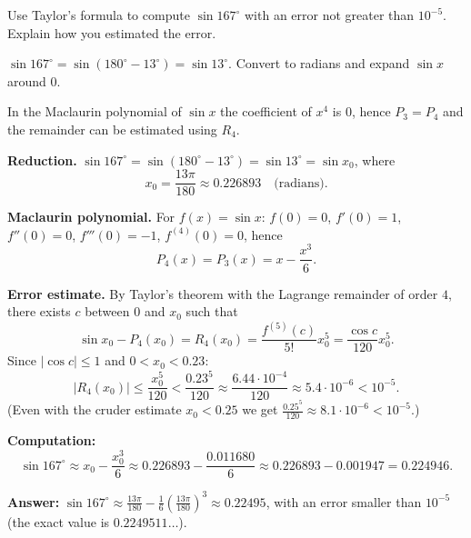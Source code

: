
\begin{question}
Use Taylor's formula to compute $\sin 167^\circ$ with an error not greater than $10^{-5}$. Explain how you estimated the error.
\end{question}

\begin{hint}
$\sin167^\circ=\sin(180^\circ-13^\circ)=\sin13^\circ$. Convert to radians and expand $\sin x$ around $0$.
\end{hint}

\begin{hint}
In the Maclaurin polynomial of $\sin x$ the coefficient of $x^4$ is $0$, hence $P_3=P_4$ and the remainder can be estimated using $R_4$.
\end{hint}

\begin{solution}
\textbf{Reduction.} $\sin167^\circ=\sin(180^\circ-13^\circ)=\sin13^\circ=\sin x_0$, where
\[
x_0=\frac{13\pi}{180}\approx0.226893 \quad\text{(radians)}.
\]

\textbf{Maclaurin polynomial.} For $f(x)=\sin x$: $f(0)=0$, $f'(0)=1$, $f''(0)=0$, $f'''(0)=-1$, $f^{(4)}(0)=0$, hence
\[
P_4(x)=P_3(x)=x-\frac{x^3}{6}.
\]

\textbf{Error estimate.} By Taylor's theorem with the Lagrange remainder of order $4$, there exists $c$ between $0$ and $x_0$ such that
\[
\sin x_0-P_4(x_0)=R_4(x_0)=\frac{f^{(5)}(c)}{5!}x_0^5=\frac{\cos c}{120}x_0^5 .
\]
Since $|\cos c|\le1$ and $0<x_0<0.23$:
\[
|R_4(x_0)|\le\frac{x_0^5}{120}<\frac{0.23^5}{120}\approx\frac{6.44\cdot10^{-4}}{120}\approx5.4\cdot10^{-6}<10^{-5}.
\]
(Even with the cruder estimate $x_0<0.25$ we get $\frac{0.25^5}{120}\approx8.1\cdot10^{-6}<10^{-5}$.)

\textbf{Computation:}
\[
\sin167^\circ\approx x_0-\frac{x_0^3}{6}\approx0.226893-\frac{0.011680}{6}\approx0.226893-0.001947=0.224946.
\]

\textbf{Answer:} $\sin167^\circ\approx\frac{13\pi}{180}-\frac16\left(\frac{13\pi}{180}\right)^3\approx0.22495$, with an error smaller than $10^{-5}$ (the exact value is $0.2249511\ldots$).
\end{solution}
